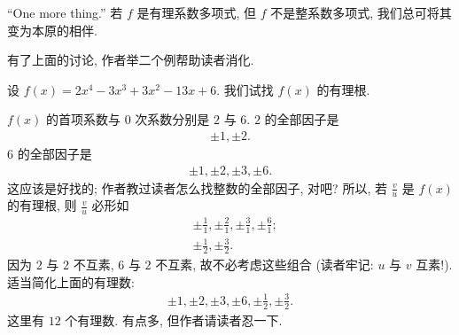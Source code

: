 ``One more thing.'' 若 $f$ 是有理系数多项式, 但 $f$ 不是整系数多项式, 我们总可将其变为本原的相伴.

有了上面的讨论, 作者举二个例帮助读者消化.

\begin{example}
    设 $f(x) = 2 x^4-3 x^3+3 x^2-13 x+6$. 我们试找 $f(x)$ 的有理根.

    $f(x)$ 的首项系数与 $0$ 次系数分别是 $2$ 与 $6$. $2$ 的全部因子是
    \begin{align*}
        \pm 1, \pm 2.
    \end{align*}
    $6$ 的全部因子是
    \begin{align*}
        \pm 1, \pm 2, \pm 3, \pm 6.
    \end{align*}
    这应该是好找的; 作者教过读者怎么找整数的全部因子, 对吧? 所以, 若 $\frac{v}{u}$ 是 $f(x)$ 的有理根, 则 $\frac{v}{u}$ 必形如
    \begin{align*}
         & {\pm \frac{1}{1}}, {\pm \frac{2}{1}}, {\pm \frac{3}{1}}, {\pm \frac{6}{1}}; \\
         & {\pm \frac{1}{2}}, {\pm \frac{3}{2}}.
    \end{align*}
    因为 $2$ 与 $2$ 不互素, $6$ 与 $2$ 不互素, 故不必考虑这些组合 (读者牢记: $u$ 与 $v$ 互素!). 适当简化上面的有理数:
    \begin{align*}
        \pm 1, \pm 2, \pm 3, \pm 6, \pm \frac{1}{2}, \pm \frac{3}{2}.
    \end{align*}
    这里有 $12$ 个有理数. 有点多, 但作者请读者忍一下.


\end{example}

